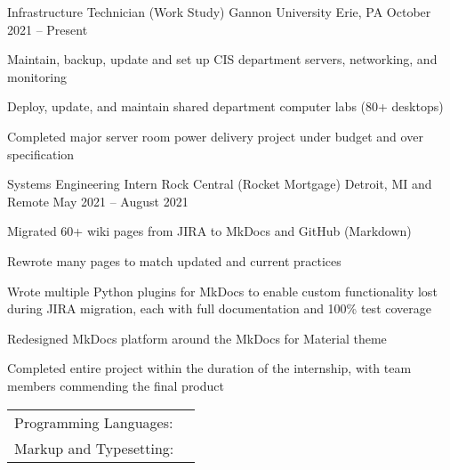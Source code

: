 \documentclass[]{awesome-cv}
\begin{document}
\vspace{-2mm}
\begin{cventries}
	\cventry
	{Infrastructure Technician (Work Study)}
	{Gannon University}
	{Erie, PA}
	{October 2021 – Present}
	{\begin{cvitems}
		\item {Maintain, backup, update and set up CIS department servers, networking, and monitoring}
		\item {Deploy, update, and maintain shared department computer labs (80+ desktops)}
		\item {Completed major server room power delivery project under budget and over specification}
		\end{cvitems}}
	\cventry
	{Systems Engineering Intern}
	{Rock Central (Rocket Mortgage)}
	{Detroit, MI and Remote}
	{May 2021 – August 2021}
	{\begin{cvitems}
		\item {Migrated 60+ wiki pages from JIRA to MkDocs and GitHub (Markdown)}
		\item {Rewrote many pages to match updated and current practices}
		\item {Wrote multiple Python plugins for MkDocs to enable custom functionality lost during JIRA migration, each with full documentation and 100\% test coverage}
		\item {Redesigned MkDocs platform around the MkDocs for Material theme}
		\item {Completed entire project within the duration of the internship, with team members commending the final product}
		\end{cvitems}}
\end{cventries}
\begin{cventries}
	\cventry
	{}
	{\def\arraystretch{1.15}{\begin{tabular}{ l l }
		Programming Languages:  & {\skill{ Java 11+, Kotlin, Kotlin Coroutines, Kotlin Serialization, Kotlin IO, Gradle (Groovy and Kotlin DSL), Python 3, Modern Android Development (MAD), HTML 5, CSS 3, JavaScript (ES6+), TypeScript, MySQL, PostgreSQL, Tailwind CSS}} \\
		Markup and Typesetting:  & {\skill{ Markdown (including GFM and other extensions), LaTeX (this resume was created with LaTeX!)}} \\
		\end{tabular}}}
	{}
	{}
	{}
\end{cventries}
\end{document}
